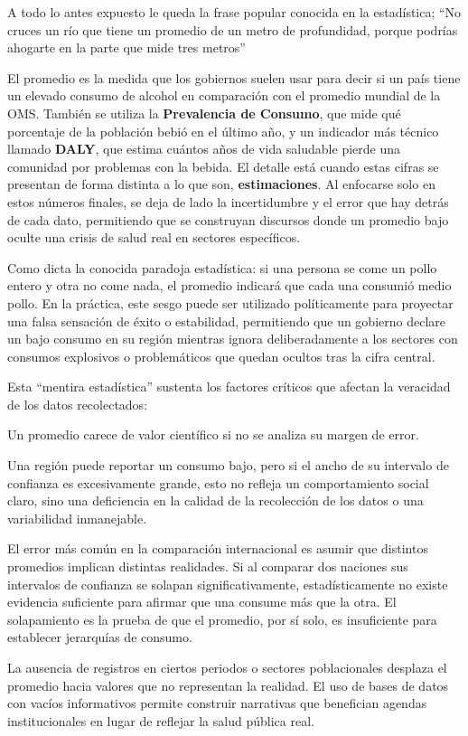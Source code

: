 \documentclass[oneside,11pt]{Latex/Classes/PhDthesisPSnPDF}
\begin{document}
A todo lo antes expuesto le queda la frase popular conocida en la
estadística; ``No cruces un río que tiene un promedio de un metro de
profundidad, porque podrías ahogarte en la parte que mide tres metros''

El promedio es la medida que los gobiernos suelen usar para decir si un
país tiene un elevado consumo de alcohol en comparación con el promedio
mundial de la OMS. También se utiliza la \textbf{Prevalencia de
Consumo}, que mide qué porcentaje de la población bebió en el último
año, y un indicador más técnico llamado \textbf{DALY}, que estima
cuántos años de vida saludable pierde una comunidad por problemas con la
bebida. El detalle está cuando estas cifras se presentan de forma
distinta a lo que son, \textbf{estimaciones}. Al enfocarse solo en estos
números finales, se deja de lado la incertidumbre y el error que hay
detrás de cada dato, permitiendo que se construyan discursos donde un
promedio bajo oculte una crisis de salud real en sectores específicos.

Como dicta la conocida paradoja estadística: si una persona se come un
pollo entero y otra no come nada, el promedio indicará que cada una
consumió medio pollo. En la práctica, este sesgo puede ser utilizado
políticamente para proyectar una falsa sensación de éxito o estabilidad,
permitiendo que un gobierno declare un bajo consumo en su región
mientras ignora deliberadamente a los sectores con consumos explosivos o
problemáticos que quedan ocultos tras la cifra central.

Esta ``mentira estadística'' sustenta los factores críticos que afectan
la veracidad de los datos recolectados:

Un promedio carece de valor científico si no se analiza su margen de
error.

Una región puede reportar un consumo bajo, pero si el ancho de su
intervalo de confianza es excesivamente grande, esto no refleja un
comportamiento social claro, sino una deficiencia en la calidad de la
recolección de los datos o una variabilidad inmanejable.

El error más común en la comparación internacional es asumir que
distintos promedios implican distintas realidades. Si al comparar dos
naciones sus intervalos de confianza se solapan significativamente,
estadísticamente no existe evidencia suficiente para afirmar que una
consume más que la otra. El solapamiento es la prueba de que el
promedio, por sí solo, es insuficiente para establecer jerarquías de
consumo.

La ausencia de registros en ciertos periodos o sectores poblacionales
desplaza el promedio hacia valores que no representan la realidad. El
uso de bases de datos con vacíos informativos permite construir
narrativas que benefician agendas institucionales en lugar de reflejar
la salud pública real.
\end{document}
